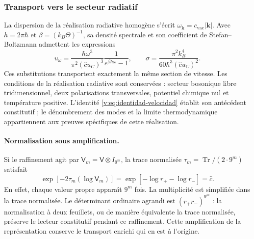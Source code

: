 \subsubsection{Transport vers le secteur radiatif}

La dispersion de la réalisation radiative homogène s’écrit
$\omega_{\symbf{k}}=c_{\mathrm{vac}}|\symbf{k}|$.
Avec $h=2\pi\hbar$ et $\beta=(k_B\Theta)^{-1}$, sa densité spectrale
et son coefficient de Stefan--Boltzmann admettent les expressions
\begin{equation}
 u_\omega=
 \frac{\hbar\omega^3}{\pi^2(\widehat c u_C)^3}
 \frac{1}{e^{\beta\hbar\omega}-1},
 \qquad
 \sigma=\frac{\pi^2k_B^4}{60\hbar^3(\widehat c u_C)^2}.
 \label{v:eq:radiacion-velocidad-constitutiva}
\end{equation}
Ces substitutions transportent exactement la même section de
vitesse. Les conditions de la réalisation radiative sont conservées :
secteur bosonique libre tridimensionnel, deux polarisations transversales,
potentiel chimique nul et température positive. L’identité
\eqref{v:eq:identidad-velocidad} établit son antécédent constitutif ;
le dénombrement des modes et la limite thermodynamique appartiennent aux preuves
spécifiques de cette réalisation.

\paragraph{Normalisation sous amplification.}
Si le raffinement agit par $\mathsf V_m=\mathsf V\otimes I_{9^m}$,
la trace normalisée $\tau_m=\operatorname{Tr}/(2\cdot9^m)$ satisfait
\[
 \exp[-2\tau_m(\log\mathsf V_m)]
 =\exp[-\log r_+-\log r_-]=\widehat c.
\]
En effet, chaque valeur propre apparaît $9^m$ fois. La multiplicité est
simplifiée dans la trace normalisée. Le déterminant ordinaire agrandi est
$(r_+r_-)^{9^m}$ : la normalisation à deux feuillets, ou de manière équivalente la
trace normalisée, préserve le lecteur constitutif pendant ce
raffinement. Cette amplification de la représentation conserve le
transport enrichi qui en est à l’origine.
